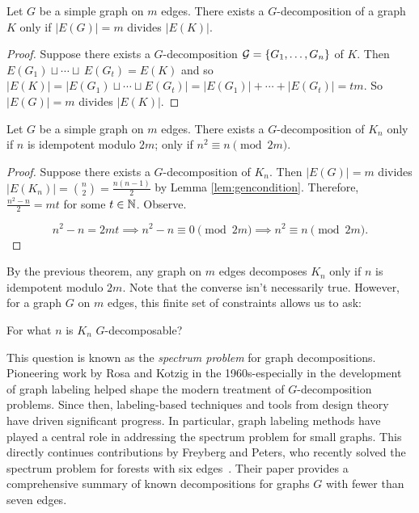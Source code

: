 \begin{lemma} \label{lem:gencondition}
  Let $G$ be a simple graph on $m$ edges. There exists a $G$-decomposition of a graph $K$ only if $|E(G)|=m$ divides $|E(K)|$. 
\end{lemma}

  \begin{proof}
  Suppose there exists a $G$-decomposition $\mathcal{G} =\{G_{1},\hdots, G_{n}\}$ of $K$. Then $E(G_{1})\sqcup \cdots \sqcup\,E(G_{t})=E(K)$ and so $|E(K)|=|E(G_{1})\sqcup \cdots \sqcup E(G_{t})|=|E(G_{1})|+ \cdots + |E(G_{t})|=tm$. So $|E(G)|=m$ divides $|E(K)|$.
  \end{proof}

\begin{thm} \label{thm:Kncondition}
  Let $G$ be a simple graph on $m$ edges. There exists a $G$-decomposition of $K_{n}$ only if $n$ is idempotent modulo $2m$; only if $n^{2}\equiv n\pmod{2m}$.
\end{thm}

\begin{proof}
  Suppose there exists a $G$-decomposition of $K_{n}$. Then $|E(G)|=m$ divides $|E(K_{n})|=\binom{n}{2}=\frac{n(n-1)}{2}$ by Lemma \ref{lem:gencondition}. Therefore, $\frac{n^{2}-n}{2}=mt$ for some $t\in \mathbb{N}$. Observe.

  $$n^{2}-n= 2mt\implies n^{2}-n\equiv 0\pmod{2m}\implies n^{2}\equiv n\pmod{2m}.$$
\end{proof}
By the previous theorem, any graph on $m$ edges decomposes $K_{n}$ only if $n$ is idempotent modulo $2m$. Note that the converse isn't necessarily true. However, for a graph $G$ on $m$ edges, this finite set of constraints allows us to ask:
\begin{center}
For what $n$ is $K_{n}$ $G$-decomposable?
\end{center}
This question is known as the \textit{spectrum problem} for graph decompositions. Pioneering work by Rosa and Kotzig in the 1960s-especially in the development of graph labeling helped shape the modern treatment of $G$-decomposition problems. Since then, labeling-based techniques and tools from design theory have driven significant progress. In particular, graph labeling methods have played a central role in addressing the spectrum problem for small graphs. This directly continues contributions by Freyberg and Peters, who recently solved the spectrum problem for forests with six edges~\cite{Peters}. Their paper provides a comprehensive summary of known decompositions for graphs $G$ with fewer than seven edges.

